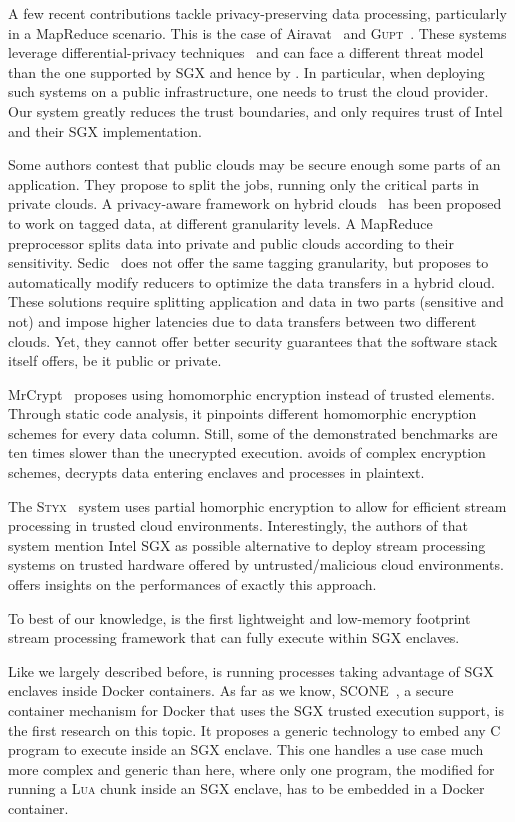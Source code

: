 A few recent contributions tackle privacy-preserving data processing, particularly in a MapReduce scenario.
This is the case of Airavat~\cite{Roy:2010:ASP:1855711.1855731} and \textsc{Gupt}~\cite{Mohan:2012:GPP:2213836.2213876}.
These systems leverage differential-privacy techniques~\cite{dwork2006calibrating} and can face a different threat model than the one supported by SGX and hence by \SYS.
In particular, when deploying such systems on a public infrastructure, one needs to trust the cloud provider.
Our system greatly reduces the trust boundaries, and only requires trust of Intel{\textregistered} and their SGX implementation.

Some authors contest that public clouds may be secure enough some parts of an application.
They propose to split the jobs, running only the critical parts in private clouds.
A privacy-aware framework on hybrid clouds~\cite{xu2015framework} has been proposed to work on tagged data, at different granularity levels.
A MapReduce preprocessor splits data into private and public clouds according to their sensitivity.
Sedic~\cite{zhang2011sedic} does not offer the same tagging granularity, but proposes to automatically modify reducers to optimize the data transfers in a hybrid cloud.
These solutions require splitting application and data in two parts (sensitive and not) and impose higher latencies due to data transfers between two different clouds.
Yet, they cannot offer better security guarantees that the software stack itself offers, be it public or private.

MrCrypt~\cite{tetali2013mrcrypt} proposes using homomorphic encryption instead of trusted elements.
Through static code analysis, it pinpoints different homomorphic encryption schemes for every data column.
Still, some of the demonstrated benchmarks are ten times slower than the unecrypted execution.
\SYS{} avoids of complex encryption schemes, decrypts data entering enclaves and processes in plaintext.

The \textsc{Styx}~\cite{Stephen:2016:SSP:2987550.2987574} system uses partial homorphic encryption to allow for efficient stream processing in trusted cloud environments.
Interestingly, the authors of that system mention Intel{\textregistered} SGX as possible alternative to deploy stream processing systems on trusted hardware offered by untrusted/malicious cloud environments.
\SYS{} offers insights on the performances of exactly this approach.

To best of our knowledge, \SYS{} is the first lightweight and low-memory footprint stream processing framework that can fully execute within SGX enclaves.

Like we largely described before, \SYS{} is running processes taking advantage of SGX enclaves inside Docker containers.
As far as we know, \textsc{SCONE}~\cite{pietzuch_scone:_nodate}, a secure container mechanism for Docker that uses the SGX trusted execution support, is the first research on this topic.
It proposes a generic technology to embed any C program to execute inside an SGX enclave.
This one handles a use case much more complex and generic than here, where only one program, the modified \luavm{} for running a \textsc{Lua} chunk inside an SGX enclave, has to be embedded in a Docker container.
